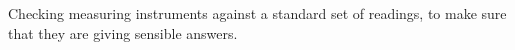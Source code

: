 Checking measuring instruments against a standard set
of readings, to make sure that they are giving sensible
answers.